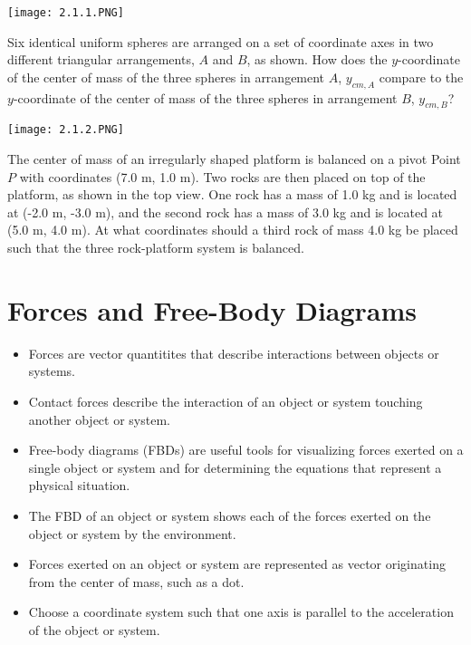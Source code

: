 \documentclass[../mech.tex]{subfiles}
\begin{document}
\ex \begin{center}
    \texttt{[image: 2.1.1.PNG]}
\end{center}
Six identical uniform spheres are arranged on a set of coordinate axes in two different triangular arrangements, $A$ and $B$, as shown. How does the $y$-coordinate of the center of mass of the 
three spheres in arrangement $A$, $y_{cm, A}$ compare to the $y$-coordinate of the center of mass of the three spheres in arrangement $B$, $y_{cm,B}$?

\pagebreak
\ex \begin{center}
    \texttt{[image: 2.1.2.PNG]}
\end{center}
The center of mass of an irregularly shaped platform is balanced on a pivot Point $P$ with coordinates (7.0 m, 1.0 m). Two rocks are then placed on top of the platform, as shown in the top view.
One rock has a mass of 1.0 kg and is located at (-2.0 m, -3.0 m), and the second rock has a mass of 3.0 kg and is located at (5.0 m, 4.0 m). At what coordinates should a third rock of mass 4.0 kg be placed 
such that the three rock-platform system is balanced.

\section{Forces and Free-Body Diagrams}
\begin{itemize}
    \item Forces are vector quantitites that describe interactions between objects or systems.
    \item Contact forces describe the interaction of an object or system touching another object or system.
    \item Free-body diagrams (FBDs) are useful tools for visualizing forces exerted on a single object or system and for determining the equations that represent a physical situation.
    \item The FBD of an object or system shows each of the forces exerted on the object or system by the environment.
    \item Forces exerted on an object or system are represented as vector originating from the center of mass, such as a dot.
    \item Choose a coordinate system such that one axis is parallel to the acceleration of the object or system.
\end{itemize}
\end{document}
